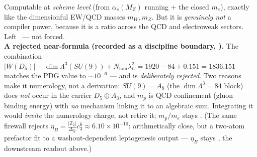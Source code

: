 \documentclass[11pt,a4paper]{article}
\newcommand{\cthree}{c_3}
\newcommand{\Nfam}{N_{\mathrm{fam}}}
\newcommand{\Z}{\mathbb{Z}}
\begin{document}
\begin{keybox}
Computable at \emph{scheme level} (from $\alpha_s(M_Z)$ running $+$ the closed $m_e$), exactly like the
dimensionful EW/QCD masses $m_W,m_Z$. But it is \emph{genuinely not} a compiler power, because it is a
ratio across the QCD and electroweak sectors. Left \mO\ --- not forced.
\smallskip\\
\noindent\textbf{A rejected near-formula (recorded as a discipline boundary, ).}
The combination $|W(D_5)|-\dim\Lambda^3(SU(9))+\Nfam\lambda_C^2=1920-84+0.151=1836.151$ matches the PDG value to
$\sim10^{-6}$ --- and is \emph{deliberately rejected}. Two reasons make it numerology, not a derivation:
$SU(9)=A_8$ (the $\dim\Lambda^3=84$ block) does \emph{not} occur in the carrier $D_5\oplus A_3$, and $m_p$ is
QCD confinement (gluon binding energy) with \emph{no} mechanism linking it to an algebraic sum. Integrating it
would \emph{invite} the numerology charge, not retire it; $m_p/m_e$ stays \mO. (The same firewall rejects
$\eta_B=\tfrac{|\Z_2|}{\Delta_Q}\cthree^6\approx6.10\times10^{-10}$: arithmetically close, but a two-atom
prefactor fit to a washout-dependent leptogenesis output --- $\eta_B$ stays \mC, the downstream readout above.)
\end{keybox}
\end{document}
